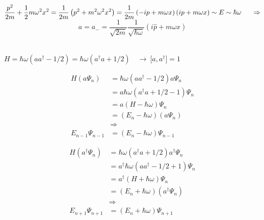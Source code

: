 \documentclass[12pt]{article}
\begin{document}
\hfill \break \\
\( \displaystyle \frac{p^2}{2m} + \frac{1}{2} m \omega^2 x^2  
    = \frac{1}{2m} \left( p^2 + m^2 \omega^2 x^2 \right)
    = \frac{1}{2m} \left( -ip + m \omega x \right) \left( i p + m \omega x \right)
    \sim E \sim \hbar \omega \indent \Rightarrow \)
\hfill \\
\[ \boxed{ \displaystyle a = a_{-} = 
    \frac{1}{\sqrt{2 m}} \frac{1}{\sqrt{\hbar \omega}} \left( i\hat{p} + m \omega x \right) } \]

\hfill \break \\
\( H = \hbar \omega (a a^\dagger - 1/2) = \hbar \omega (a^\dagger a + 1/2)\)
\( \ \ \ \rightarrow \ \boxed{ \big[ a, a^\dagger \big]=1 } \)\\
\begin{minipage}{0.5\textwidth}
    \begin{align*} 
        H( a \Psi_n ) &= \hbar \omega (a a^\dagger - 1/2) a \Psi_n\\
        &= a \hbar \omega (a^\dagger a + 1/2 - 1) \Psi_n\\ 
        &= a(H - \hbar \omega) \Psi_n\\
        &= (E_n - \hbar \omega) ( a \Psi_n )\\
        &\Rightarrow\\
        E_{n-1} \Psi_{n-1} &= (E_n - \hbar \omega) \Psi_{n-1}
    \end{align*}    
\end{minipage}
\begin{minipage}{0.5\textwidth}
    \begin{align*} 
        H( a^\dagger \Psi_n ) &= \hbar \omega (a^\dagger a + 1/2) a^\dagger \Psi_n \\
        &= a^\dagger \hbar \omega (a a^\dagger - 1/2 + 1) \Psi_n\\ 
        &= a^\dagger (H + \hbar \omega) \Psi_n\\
        &= (E_n + \hbar \omega) ( a^\dagger \Psi_n )\\
        &\Rightarrow\\
        E_{n+1} \Psi_{n+1} &= (E_n + \hbar \omega) \Psi_{n+1}
    \end{align*}
\end{minipage}

\begin{center}  \end{center} 
\end{document}
